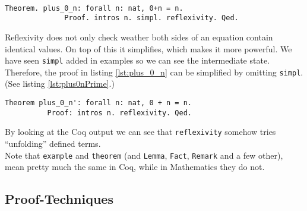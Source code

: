 	   \begin{example} ~\\\vspace{-5mm}
	  	   {\normalfont \begin{lstlisting}[caption=\lstinline!plus_0_n!, label=lst:plus_0_n]
	   		Theorem. plus_0_n: forall n: nat, 0+n = n.
	   		  Proof. intros n. simpl. reflexivity. Qed.
	    	\end{lstlisting}	}	
		\end{example}              
	    \begin{remark}
	    	Reflexivity does not only check weather both sides of an equation contain identical values. 
	    	On top of this it simplifies, which makes it more powerful. 
	    	We have seen \lstinline!simpl! added in examples so we can see the intermediate state.
	    	Therefore, the proof in listing \ref{lst:plus_0_n} can be simplified by omitting \lstinline!simpl!.(See listing \ref{lst:plus0nPrime}.) 
	     \end{remark}	
	
		\begin{lstlisting}[caption={ \lstinline!plus_0_n'!}, label= lst:plus0nPrime]
	    Theorem plus_0_n': forall n: nat, 0 + n = n.
	      Proof: intros n. reflexivity. Qed.	
	    \end{lstlisting}    
	    By looking at the Coq output we can see that \lstinline!reflexivity! somehow tries ``unfolding'' defined terms.\\    
	    Note that \lstinline!example! and \lstinline!theorem! (and \lstinline!Lemma!, \lstinline!Fact!, \lstinline!Remark! and a few other),
	    mean pretty much the same in Coq, while in Mathematics they do not.
	    
	   
	\subsection{Proof-Techniques}
	\label{subsec:proof-techniques}
	    
